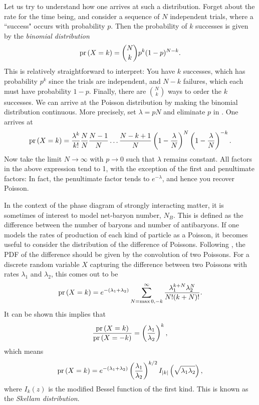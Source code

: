 Let us try to understand how one arrives at such a distribution.
Forget about the rate for the time being, and consider a sequence of 
$N$ independent trials, where a ``success" occurs with probability $p$.
Then the probability of $k$ successes is given by the {\it binomial
distribution}
\begin{equation}\label{eq:binomial}
\operatorname{pr}\left(X=k\right)=\binom{N}{k}p^k(1-p)^{N-k}.
\end{equation}
This is relatively straightforward to interpret: You have $k$ successes,
which has probability $p^k$ since the trials are independent, and $N-k$
failures, which each must have probability $1-p$. Finally, there are
$\binom{N}{k}$ ways to order the $k$ successes. We can arrive at the Poisson
distribution by making the binomial distribution continuous.
More precisely, set $\lambda=pN$ and eliminate $p$ in .
One arrives at
\begin{equation}
\operatorname{pr}\left(X=k\right)=\frac{\lambda^k}{k!}\frac{N}{N}\frac{N-1}{N}\dots
\frac{N-k+1}{N}\left(1-\frac{\lambda}{N}\right)^N
\left(1-\frac{\lambda}{N}\right)^{-k}.
\end{equation}
Now take the limit $N\to\infty$ with $p\to0$ such that $\lambda$ remains
constant. All factors in the above expression tend to 1, with the
exception of the first and penultimate factors: In fact, the penultimate
factor tends to $e^{-\lambda}$, and hence you recover Poisson.

In the context of the phase diagram of strongly interacting matter, it is
sometimes of interest to model net-baryon number, $N_B$.
This is defined as the difference between the number of baryons and number 
of antibaryons. If one models the rates of production of each kind of particle
as a Poisson, it becomes useful to consider the distribution of the difference
of Poissons. Following , the PDF of the difference should
be given by the convolution of two Poissons. For a discrete random variable $X$
capturing the difference between two Poissons with rates $\lambda_1$ and
$\lambda_2$, this comes out to be
\begin{equation}
\operatorname{pr}\left(X=k\right)=e^{-(\lambda_1+\lambda_2)}
\sum_{N=\max{0,-k}}^\infty \frac{\lambda_1^{k+N}\lambda_2^N}{N!(k+N)!}.
\end{equation} 
It can be shown this implies that
\begin{equation}
\frac{\operatorname{pr}\left(X=k\right)}{\operatorname{pr}\left(X=-k\right)}=
\left(\frac{\lambda_1}{\lambda_2}\right)^k,
\end{equation} 
which means
\begin{equation}
\operatorname{pr}\left(X=k\right)=e^{-(\lambda_1+\lambda_2)}
\left(\frac{\lambda_1}{\lambda_2}\right)^{k/2}I_{|k|}\left(\sqrt{\lambda_1\lambda_2}\right),
\end{equation} 
where $I_k(z)$ is the modified Bessel function of the first kind.
This is known as the {\it Skellam distribution}.

